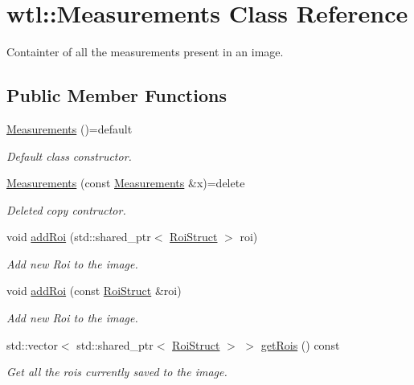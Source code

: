 \hypertarget{classwtl_1_1_measurements}{}\section{wtl\+:\+:Measurements Class Reference}
\label{classwtl_1_1_measurements}


Containter of all the measurements present in an image.  


\subsection*{Public Member Functions}
\begin{DoxyCompactItemize}
\item 
\hyperlink{classwtl_1_1_measurements_acb3ccc3f9a1a8322f80a8ff7891fec07}{Measurements} ()=default
\begin{DoxyCompactList}\small\item\em Default class constructor. \end{DoxyCompactList}\item 
\hyperlink{classwtl_1_1_measurements_a01e5d71f0613863ff9b156a7f420880a}{Measurements} (const \hyperlink{classwtl_1_1_measurements}{Measurements} \&x)=delete
\begin{DoxyCompactList}\small\item\em Deleted copy contructor. \end{DoxyCompactList}\item 
void \hyperlink{classwtl_1_1_measurements_a0e01de8663026fb293a904635f234745}{add\+Roi} (std\+::shared\+\_\+ptr$<$ \hyperlink{structwtl_1_1_roi_struct}{Roi\+Struct} $>$ roi)
\begin{DoxyCompactList}\small\item\em Add new Roi to the image. \end{DoxyCompactList}\item 
void \hyperlink{classwtl_1_1_measurements_ab0ea1cd53b62e0f86ad27761208832a6}{add\+Roi} (const \hyperlink{structwtl_1_1_roi_struct}{Roi\+Struct} \&roi)
\begin{DoxyCompactList}\small\item\em Add new Roi to the image. \end{DoxyCompactList}\item 
std\+::vector$<$ std\+::shared\+\_\+ptr$<$ \hyperlink{structwtl_1_1_roi_struct}{Roi\+Struct} $>$ $>$ \hyperlink{classwtl_1_1_measurements_a3e618f3c6ab36634fb4c01106a89b3fd}{get\+Rois} () const
\begin{DoxyCompactList}\small\item\em Get all the rois currently saved to the image. \end{DoxyCompactList}\item 

\end{DoxyCompactItemize}
